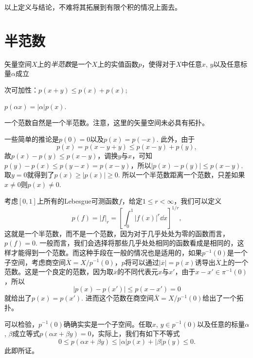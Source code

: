 以上定义与结论，不难将其拓展到有限个积的情况上面去。

\section{半范数}

\begin{para}
矢量空间$X$上的\textit{半范数}是一个$X$上的实值函数$p$，使得对于$X$中任意$x$, $y$以及任意标量$\alpha$成立
\begin{compactenum}
\item 次可加性：$p(x+y)\leq p(x)+p(x)$;
\item $p(\alpha x)=|\alpha|p(x)$.
\end{compactenum}
一个范数自然是一个半范数。注意，这里的矢量空间未必具有拓扑。

一些简单的推论是$p(0)=0$以及$p(x)=p(-x)$. 此外，由于
\[
	p(x)=p(x-y+y)\leq p(x-y)+p(y),
\]
故$p(x)-p(y)\leq p(x-y)$，调换$y$与$x$，可知$p(y)-p(x)\leq p(y-x)=p(x-y)$，所以$|p(x)-p(y)|\leq p(x-y)$. 取$y=0$就得到了$p(x)\geq |p(x)|\geq 0$. 所以一个半范数距离一个范数，只差如果$x\neq 0$则$p(x)\neq 0$.

考虑$[0,1]$上所有的Lebesgue可测函数$f$，给定$1\leq r<\infty$，我们可以定义
\[
	p(f)=|f|_r=\left[\int_{0}^{1}|f(x)|^r\dd x\right]^{1/r},
\]
这就是一个半范数，而不是一个范数，因为对于几乎处处为零的函数而言，$p(f)=0$. 一般而言，我们会选择将那些几乎处处相同的函数看成是相同的，这样才能得到一个范数。而这种手段在一般的情况也是适用的，如果$p^{-1}(0)$是一个子空间，考虑商空间$\overline{X}=X/p^{-1}(0)$，$p$将可以通过$|\overline{x}|=p(x)$诱导出$\overline{X}$上的一个范数。这是一个良定的范数，因为取$\overline{x}$的不同代表元$x$与$x'$，由于$x-x'\in \pi^{-1}(0)$，所以
\[
	|p(x)-p(x')|\leq p(x-x')=0
\]
就给出了$p(x)=p(x')$. 进而这个范数在商空间$\overline{X}=X/p^{-1}(0)$给出了一个拓扑。

可以检验，$p^{-1}(0)$确确实实是一个子空间。任取$x$, $y\in p^{-1}(0)$以及任意的标量$\alpha$, $\beta$成立等式$p(\alpha x+\beta y)=0$，实际上，我们有如下不等式
\[
	0\leq p(\alpha x+\beta y)\leq |\alpha|p(x)+|\beta|p(y)\leq 0.
\]
此即所证。
\end{para}




